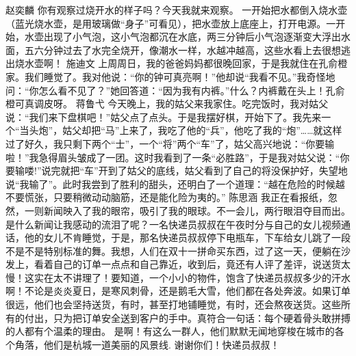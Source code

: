 {}\markdownRendererInterblockSeparator
{}赵奕麟\markdownRendererInterblockSeparator
{}你有观察过烧开水的样子吗？今天我就来观察。\markdownRendererInterblockSeparator
{}一开始把水都倒入烧水壶（蓝光烧水壶，是用玻璃做“身子”可看见），把水壶放上底座上，打开电源。一开始，水壶出现了小气泡，这小气泡都沉在水底，两三分钟后小气泡逐渐变大浮出水面，五六分钟过去了水完全烧开，像潮水一样，水越冲越高，这些水看上去很想逃出烧水壶啊！\markdownRendererInterblockSeparator
{}\markdownRendererInterblockSeparator
{}施迪文\markdownRendererInterblockSeparator
{}上周周日，我的爸爸妈妈都很晚回家，于是我就住在孔俞橙家。我们睡觉了。我对他说：“你的钟可真亮啊！”他却说“我看不见。”我奇怪地问：“你怎么看不见了？”她回答道：“因为我有内裤。”什么？内裤戴在头上！孔俞橙可真调皮呀。\markdownRendererInterblockSeparator
{}\markdownRendererInterblockSeparator
{}蒋鲁弋\markdownRendererInterblockSeparator
{}今天晚上，我的姑父来我家住。吃完饭时，我对姑父说：“我们来下盘棋吧！”姑父点了点头。于是我摆好棋，开始下了。我先来一个“当头炮”，姑父却把“马”上来了，我吃了他的“兵”，他吃了我的“炮”……就这样过了好久，我只剩下两个“士”，一个“将”两个“车”了，姑父高兴地说：“你要输啦！”我急得眉头皱成了一团。这时我看到了一条“必胜路”，于是我对姑父说：“你要输喽!”说完就把“车”开到了姑父的底线，姑父看到了自己的将没保护好，失望地说“我输了”。此时我尝到了胜利的甜头，还明白了一个道理：“越在危险的时候越不要慌张，只要稍微动动脑筋，还是能化险为夷的。”\markdownRendererInterblockSeparator
{}\markdownRendererInterblockSeparator
{}陈思涵\markdownRendererInterblockSeparator
{}我正在看报纸，忽然，一则新闻映入了我的眼帘，吸引了我的眼球。不一会儿，两行眼泪夺目而出。是什么新闻让我感动的流泪了呢？一名快递员叔叔在午夜时分与自己的女儿视频通话，他的女儿不肯睡觉，于是，那名快递员叔叔停下电瓶车，下车给女儿跳了一段不是不是特别标准的舞。我想，人们在双十一拼命买东西，过了这一天，便躺在沙发上，看着自己的订单一点点和自己靠近，收到后，竟还有人评了差评，说送货太慢！这实在太不讲理了！要知道，一个小小的物件，饱含了快递员叔叔多少的汗水啊！不论是炎炎夏日，是寒风刺骨，还是鹅毛大雪，他们都在各处奔波。如果订单很远，他们也会坚持送货，有时，甚至打地铺睡觉，有时，还会熬夜送货。这些所有的付出，只为把订单安全送到客户的手中。真符合一句话：每个硬着骨头敢拼搏的人都有个温柔的理由。\markdownRendererInterblockSeparator
{}是啊！有这么一群人，他们默默无闻地穿梭在城市的各个角落，他们是杭城一道美丽的风景线.\markdownRendererInterblockSeparator
{}谢谢你们！快递员叔叔！\markdownRendererInterblockSeparator
